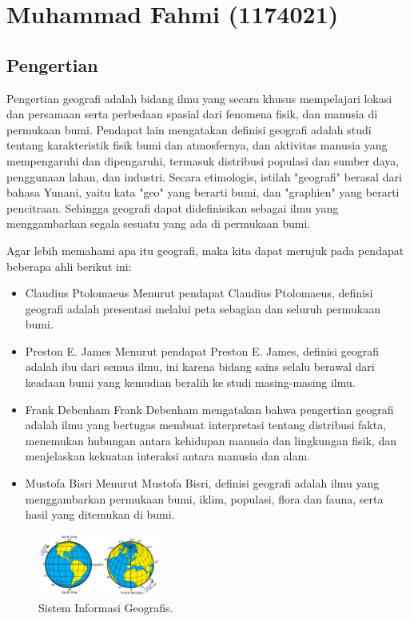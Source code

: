 \section{Muhammad Fahmi (1174021)}

\subsection{Pengertian}
Pengertian geografi adalah bidang ilmu yang secara khusus mempelajari lokasi dan persamaan serta perbedaan spasial dari fenomena fisik, dan manusia di permukaan bumi. \hfill\break
Pendapat lain mengatakan definisi geografi adalah studi tentang karakteristik fisik bumi dan atmosfernya, dan aktivitas manusia yang mempengaruhi dan dipengaruhi, termasuk distribusi populasi dan sumber daya, penggunaan lahan, dan industri. \hfill\break
Secara etimologis, istilah "geografi" berasal dari bahasa Yunani, yaitu kata "geo" yang berarti bumi, dan "graphien" yang berarti pencitraan. Sehingga geografi dapat didefinisikan sebagai ilmu yang menggambarkan segala sesuatu yang ada di permukaan bumi.\hfill\break

Agar lebih memahami apa itu geografi, maka kita dapat merujuk pada pendapat beberapa ahli berikut ini: \hfill\break
\begin{itemize}
	\item Claudius Ptolomaeus
Menurut pendapat Claudius Ptolomaeus, definisi geografi adalah presentasi melalui peta sebagian dan seluruh permukaan bumi.
	\item Preston E. James
Menurut pendapat Preston E. James, definisi geografi adalah ibu dari semua ilmu, ini karena bidang sains selalu berawal dari keadaan bumi yang kemudian beralih ke studi masing-masing ilmu.
	\item Frank Debenham
Frank Debenham mengatakan bahwa pengertian geografi adalah ilmu yang bertugas membuat interpretasi tentang distribusi fakta, menemukan hubungan antara kehidupan manusia dan lingkungan fisik, dan menjelaskan kekuatan interaksi antara manusia dan alam.
	\item Mustofa Bisri
Menurut Mustofa Bisri, definisi geografi adalah ilmu yang menggambarkan permukaan bumi, iklim, populasi, flora dan fauna, serta hasil yang ditemukan di bumi. 
\end{itemize} \hfill\break

\begin{figure}[H]
	\includegraphics[width=4cm]{figures/1174021/1.png}
	\centering
	\caption{Sistem Informasi Geografis.}
\end{figure}


